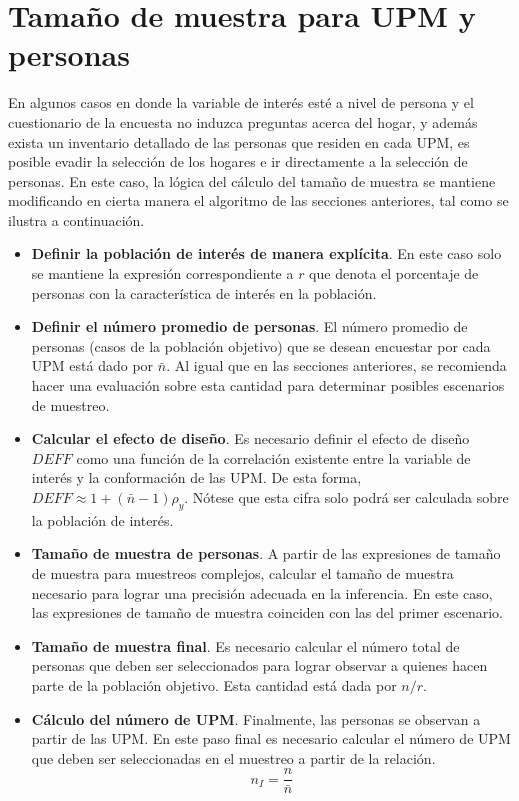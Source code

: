 \documentclass[
  12pt,
]{book}
\begin{document}
\hypertarget{tamauxf1o-de-muestra-para-upm-y-personas}{%
\section{Tamaño de muestra para UPM y personas}\label{tamauxf1o-de-muestra-para-upm-y-personas}}

En algunos casos en donde la variable de interés esté a nivel de persona y el cuestionario de la encuesta no induzca preguntas acerca del hogar, y además exista un inventario detallado de las personas que residen en cada UPM, es posible evadir la selección de los hogares e ir directamente a la selección de personas. En este caso, la lógica del cálculo del tamaño de muestra se mantiene modificando en cierta manera el algoritmo de las secciones anteriores, tal como se ilustra a continuación.

\begin{itemize}
\item
  \textbf{Definir la población de interés de manera explícita}. En este caso solo se mantiene la expresión correspondiente a \(r\) que denota el porcentaje de personas con la característica de interés en la población.
\item
  \textbf{Definir el número promedio de personas}. El número promedio de personas (casos de la población objetivo) que se desean encuestar por cada UPM está dado por \(\bar{n}\). Al igual que en las secciones anteriores, se recomienda hacer una evaluación sobre esta cantidad para determinar posibles escenarios de muestreo.
\item
  \textbf{Calcular el efecto de diseño}. Es necesario definir el efecto de diseño \(DEFF\) como una función de la correlación existente entre la variable de interés y la conformación de las UPM. De esta forma, \(DEFF \approx 1 + (\bar{n} - 1)\rho_y\). Nótese que esta cifra solo podrá ser calculada sobre la población de interés.
\item
  \textbf{Tamaño de muestra de personas}. A partir de las expresiones de tamaño de muestra para muestreos complejos, calcular el tamaño de muestra necesario para lograr una precisión adecuada en la inferencia. En este caso, las expresiones de tamaño de muestra coinciden con las del primer escenario.
\item
  \textbf{Tamaño de muestra final}. Es necesario calcular el número total de personas que deben ser seleccionados para lograr observar a quienes hacen parte de la población objetivo. Esta cantidad está dada por \(n / r\).
\item
  \textbf{Cálculo del número de UPM}. Finalmente, las personas se observan a partir de las UPM. En este paso final es necesario calcular el número de UPM que deben ser seleccionadas en el muestreo a partir de la relación.
  \[
  n_{I} = \frac{n}{\bar{n}} 
  \]
\end{itemize}
\end{document}
